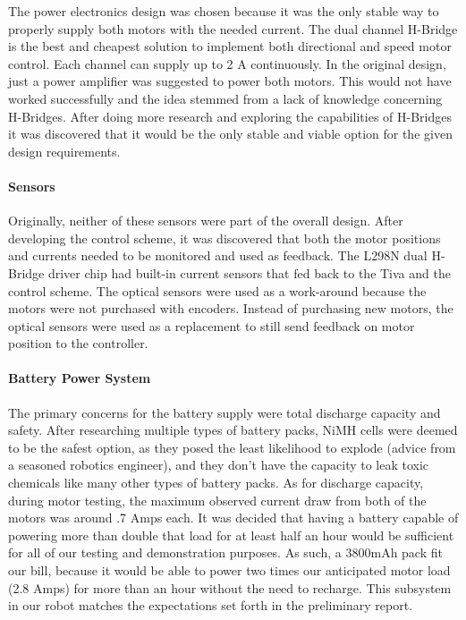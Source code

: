 \documentclass[11pt]{report}
\begin{document}
\begin{spacing}{1.5}
        The power electronics design was chosen because it was the only stable way to properly supply both motors with the needed current. The dual channel H-Bridge is the best and cheapest solution to implement both directional and speed motor control. Each channel can supply up to 2 A continuously. In the original design, just a power amplifier was suggested to power both motors. This would not have worked successfully and the idea stemmed from a lack of knowledge concerning H-Bridges. After doing more research and exploring the capabilities of H-Bridges it was discovered that it would be the only stable and viable option for the given design requirements.
        
        \paragraph{Sensors}
        
        Originally, neither of these sensors were part of the overall design. After developing the control scheme, it was discovered that both the motor positions and currents needed to be monitored and used as feedback. The L298N dual H-Bridge driver chip had built-in current sensors that fed back to the Tiva and the control scheme. The optical sensors were used as a work-around because the motors were not purchased with encoders. Instead of purchasing new motors, the optical sensors were used as a replacement to still send feedback on motor position to the controller.
        
        \paragraph{Battery Power System}
        
        The primary concerns for the battery supply were total discharge capacity and safety. After researching multiple types of battery packs, NiMH cells were deemed to be the safest option, as they posed the least likelihood to explode (advice from a seasoned robotics engineer), and they don’t have the capacity to leak toxic chemicals like many other types of battery packs. As for discharge capacity, during motor testing, the maximum observed current draw from both of the motors was around .7 Amps each. It was decided that having a battery capable of powering more than double that load for at least half an hour would be sufficient for all of our testing and demonstration purposes. As such, a 3800mAh pack fit our bill, because it would be able to power two times our anticipated motor load (2.8 Amps) for more than an hour without the need to recharge. This subsystem in our robot matches the expectations set forth in the preliminary report.
        

\end{spacing}
\end{document}
